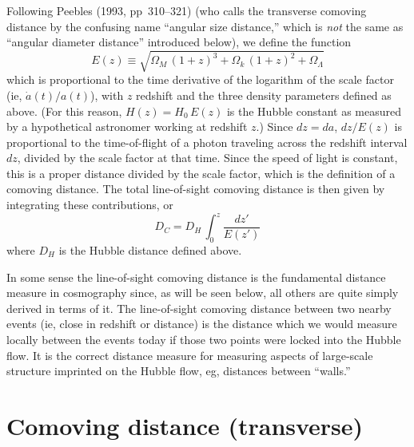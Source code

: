 Following Peebles (1993, pp~310--321) (who calls the transverse
comoving distance by the confusing name ``angular size distance,''
which is {\em not\/} the same as ``angular diameter distance''
introduced below), we define the function
\begin{equation}
E(z)\equiv\sqrt{\Omega_M\,(1+z)^3+\Omega_k\,(1+z)^2+\Omega_{\Lambda}}
\end{equation}
which is proportional to the time derivative of the logarithm of the
scale factor (ie, $\dot{a}(t)/a(t)$), with $z$ redshift and the three
density parameters defined as above.  (For this reason,
$H(z)=H_0\,E(z)$ is the Hubble constant as measured by a hypothetical
astronomer working at redshift $z$.)  Since $dz=da$, $dz/E(z)$ is
proportional to the time-of-flight of a photon traveling across the
redshift interval $dz$, divided by the scale factor at that time.
Since the speed of light is constant, this is a proper distance
divided by the scale factor, which is the definition of a comoving
distance.  The total line-of-sight comoving distance is then given by
integrating these contributions, or
\begin{equation}
D_C = D_H\,\int_0^z\frac{dz'}{E(z')}
\end{equation}
where $D_H$ is the Hubble distance defined above.

In some sense the line-of-sight comoving distance is the fundamental
distance measure in cosmography since, as will be seen below, all
others are quite simply derived in terms of it.  The line-of-sight
comoving distance between two nearby events (ie, close in redshift or
distance) is the distance which we would measure locally between the
events today if those two points were locked into the Hubble flow.  It
is the correct distance measure for measuring aspects of large-scale
structure imprinted on the Hubble flow, eg, distances between
``walls.''


\section{Comoving distance (transverse)}

